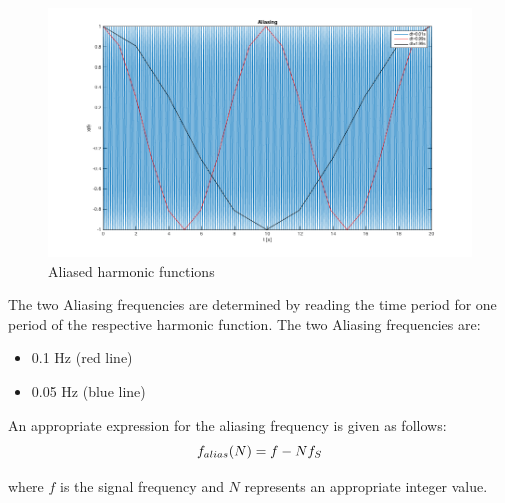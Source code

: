 \documentclass[12pt]{article}
\begin{document}
\begin{figure}[h]
	\centering
	\includegraphics[width=\linewidth]{images/ass1_2}	
	\caption{Aliased harmonic functions}
	\label{fig:sampling}
\end{figure}
The two Aliasing frequencies are determined by reading the time period for one period of the respective harmonic function.
The two Aliasing frequencies are:

\begin{itemize}
	\item 0.1 Hz (red line)
	\item 0.05 Hz (blue line)
\end{itemize}

An appropriate expression for the aliasing frequency is given as follows:
\begin{equation}
\centering
	f_{alias}(N) = f - N f_{S}
	\label{eq:alias}
\end{equation}

where $f$ is the signal frequency and $N$ represents an appropriate integer value.


\addtocounter{section}{1}


\end{document}
